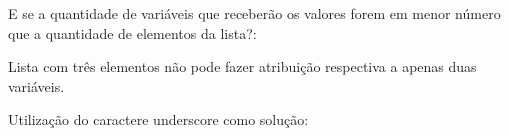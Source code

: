 \documentclass[letterpaper,10pt,brazil]{sphinxmanual}
\begin{document}
\begin{sphinxVerbatim}[commandchars=\\\{\}]
\end{sphinxVerbatim}

\begin{sphinxVerbatim}[commandchars=\\\{\}]
\end{sphinxVerbatim}

E se a quantidade de variáveis que receberão os valores forem em menor
número que a quantidade de elementos da lista?:

\begin{sphinxVerbatim}[commandchars=\\\{\}]
   
\end{sphinxVerbatim}

\begin{sphinxVerbatim}[commandchars=\\\{\}]
\end{sphinxVerbatim}

Lista com três elementos não pode fazer atribuição respectiva a apenas
duas variáveis.

Utilização do caractere underscore como solução:

\begin{sphinxVerbatim}[commandchars=\\\{\}]
    
\end{sphinxVerbatim}

\begin{sphinxVerbatim}[commandchars=\\\{\}]
\end{sphinxVerbatim}

\begin{sphinxVerbatim}[commandchars=\\\{\}]
\end{sphinxVerbatim}

\begin{sphinxVerbatim}[commandchars=\\\{\}]
\end{sphinxVerbatim}
\end{document}
